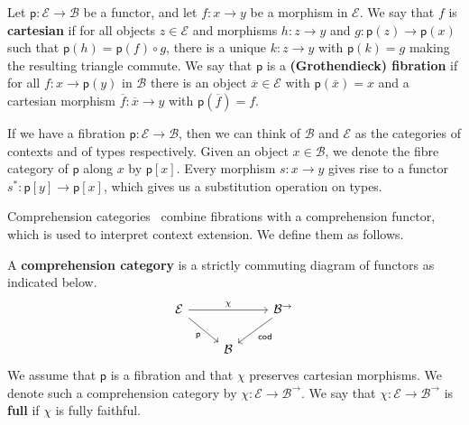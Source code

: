 \documentclass[a4paper,UKenglish,cleveref,numberwithinsect, autoref, thm-restate]{lipics-v2021}
\newcommand{\Base}{\mathcal{B}}
\newcommand{\Total}{\mathcal{E}}
\newcommand{\fib}{\mathsf{p}}
\newcommand{\comp}{\chi}
\newcommand{\Arrow}[1]{#1^{\rightarrow}}
\newcommand{\cod}{\mathsf{cod}}
\newcommand{\subst}[1]{#1^*}
\newcommand{\fiber}[2]{#1[#2]}
\newcommand{\disp}[1]{\overline{#1}}
\newcommand{\xx}{\disp{x}}
\newcommand{\ff}{\disp{f}}
\begin{document}
\begin{definition}
\label{def:fibration}
Let $\fib : \Total \rightarrow \Base$ be a functor,
and let $f : x \rightarrow y$ be a morphism in $\Total$.
We say that $f$ is \textbf{cartesian}
if for all objects $z \in \Total$
and morphisms $h : z \rightarrow y$ and $g : \fib(z) \rightarrow \fib(x)$
such that $\fib(h) = \fib(f) \circ g$,
there is a unique $k : z \rightarrow y$ with $\fib(k) = g$
making the resulting triangle commute.
We say that $\fib$ is a \textbf{(Grothendieck) fibration}
if for all $f : x \rightarrow \fib(y)$ in $\Base$
there is an object $\xx \in \Total$ with $\fib(\xx) = x$
and a cartesian morphism $\ff : \xx \rightarrow y$
with $\fib(\ff) = f$.
\end{definition}

If we have a fibration $\fib : \Total \rightarrow \Base$,
then we can think of $\Base$ and $\Total$ as the categories of contexts and of types respectively.
Given an object $x \in \Base$,
we denote the fibre category of $\fib$ along $x$ by $\fiber{\fib}{x}$.
Every morphism $s : x \rightarrow y$ gives rise to a functor $\subst{s} : \fiber{\fib}{y} \rightarrow \fiber{\fib}{x}$,
which gives us a substitution operation on types.

Comprehension categories~\cite{jacobs:2001} combine fibrations with a comprehension functor,
which is used to interpret context extension.
We define them as follows.

\begin{definition}
\label{def:comp-cat}
A \textbf{comprehension category} is a strictly commuting diagram of functors as indicated below.
\[
\begin{tikzcd}
    \Total && {\Arrow{\Base}} \\
    & \Base
	\arrow["\comp", from=1-1, to=1-3]
	\arrow["\fib"', from=1-1, to=2-2]
	\arrow["\cod", from=1-3, to=2-2]
\end{tikzcd}
\]
We assume that $\fib$ is a fibration
and that $\comp$ preserves cartesian morphisms.
We denote such a comprehension category by $\comp : \Total \rightarrow \Arrow{\Base}$.
We say that $\comp : \Total \rightarrow \Arrow{\Base}$ is \textbf{full} if $\comp$ is fully faithful.
\end{definition}
\end{document}
